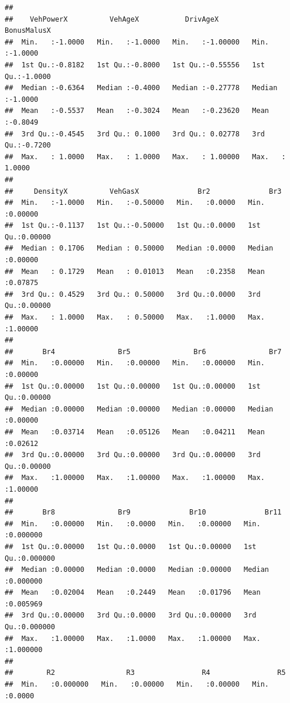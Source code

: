 \documentclass[
]{article}
\begin{document}
\begin{verbatim}
##                                                                           
##    VehPowerX          VehAgeX           DrivAgeX         BonusMalusX     
##  Min.   :-1.0000   Min.   :-1.0000   Min.   :-1.00000   Min.   :-1.0000  
##  1st Qu.:-0.8182   1st Qu.:-0.8000   1st Qu.:-0.55556   1st Qu.:-1.0000  
##  Median :-0.6364   Median :-0.4000   Median :-0.27778   Median :-1.0000  
##  Mean   :-0.5537   Mean   :-0.3024   Mean   :-0.23620   Mean   :-0.8049  
##  3rd Qu.:-0.4545   3rd Qu.: 0.1000   3rd Qu.: 0.02778   3rd Qu.:-0.7200  
##  Max.   : 1.0000   Max.   : 1.0000   Max.   : 1.00000   Max.   : 1.0000  
##                                                                          
##     DensityX          VehGasX              Br2              Br3         
##  Min.   :-1.0000   Min.   :-0.50000   Min.   :0.0000   Min.   :0.00000  
##  1st Qu.:-0.1137   1st Qu.:-0.50000   1st Qu.:0.0000   1st Qu.:0.00000  
##  Median : 0.1706   Median : 0.50000   Median :0.0000   Median :0.00000  
##  Mean   : 0.1729   Mean   : 0.01013   Mean   :0.2358   Mean   :0.07875  
##  3rd Qu.: 0.4529   3rd Qu.: 0.50000   3rd Qu.:0.0000   3rd Qu.:0.00000  
##  Max.   : 1.0000   Max.   : 0.50000   Max.   :1.0000   Max.   :1.00000  
##                                                                         
##       Br4               Br5               Br6               Br7         
##  Min.   :0.00000   Min.   :0.00000   Min.   :0.00000   Min.   :0.00000  
##  1st Qu.:0.00000   1st Qu.:0.00000   1st Qu.:0.00000   1st Qu.:0.00000  
##  Median :0.00000   Median :0.00000   Median :0.00000   Median :0.00000  
##  Mean   :0.03714   Mean   :0.05126   Mean   :0.04211   Mean   :0.02612  
##  3rd Qu.:0.00000   3rd Qu.:0.00000   3rd Qu.:0.00000   3rd Qu.:0.00000  
##  Max.   :1.00000   Max.   :1.00000   Max.   :1.00000   Max.   :1.00000  
##                                                                         
##       Br8               Br9              Br10              Br11         
##  Min.   :0.00000   Min.   :0.0000   Min.   :0.00000   Min.   :0.000000  
##  1st Qu.:0.00000   1st Qu.:0.0000   1st Qu.:0.00000   1st Qu.:0.000000  
##  Median :0.00000   Median :0.0000   Median :0.00000   Median :0.000000  
##  Mean   :0.02004   Mean   :0.2449   Mean   :0.01796   Mean   :0.005969  
##  3rd Qu.:0.00000   3rd Qu.:0.0000   3rd Qu.:0.00000   3rd Qu.:0.000000  
##  Max.   :1.00000   Max.   :1.0000   Max.   :1.00000   Max.   :1.000000  
##                                                                         
##        R2                 R3                R4                R5        
##  Min.   :0.000000   Min.   :0.00000   Min.   :0.00000   Min.   :0.0000  

\end{verbatim}
\end{document}
